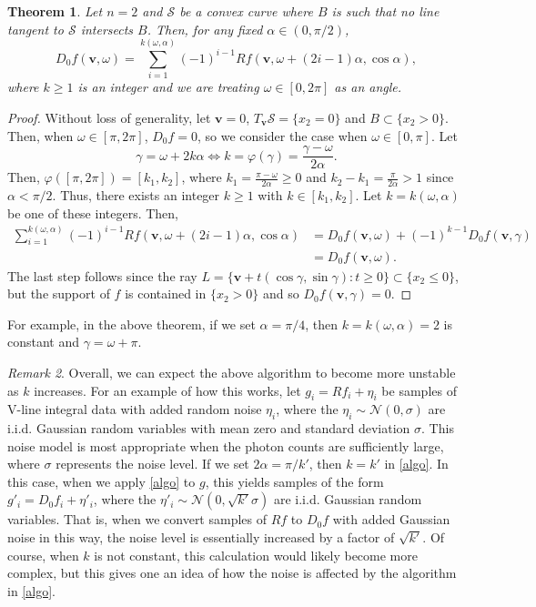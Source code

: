 \documentclass[a4paper,12pt]{amsart}
\numberwithin{equation}{section}
\theoremstyle{plain}
\newtheorem{theorem}{Theorem}
\numberwithin{theorem}{section}
\theoremstyle{definition}
\theoremstyle{remark}
\newtheorem{remark}[theorem]{Remark}
\theoremstyle{remark}
\theoremstyle{remark}
\newcommand{\s}{\mathcal S}
\newcommand{\vv}{{\mathbf{v}}}
\begin{document}
\begin{theorem}\label{simple_algo}
Let $n=2$ and $\s$ be a convex curve where $B$ is such that no line tangent to $\s$ intersects $B$. Then, for any fixed $\alpha \in (0,\pi/2)$,
\begin{equation}
D_{0}f(\vv,\omega) = \sum_{i=1}^{k(\omega, \alpha)} (-1)^{i-1} Rf(\vv,\omega + (2i-1)\alpha, \cos\alpha),
\end{equation}
where $k \geq 1$ is an integer and we are treating $\omega \in [0,2\pi]$ as an angle.
\end{theorem}
\begin{proof}
Without loss of generality, let $\vv = 0$, $T_\vv\s = \{x_2 = 0\}$ and $B \subset \{x_2 > 0\}$. Then, when $\omega \in [\pi,2\pi]$, $D_{0}f = 0$, so we consider the case when $\omega \in [0,\pi]$. Let
$$\gamma = \omega +2k \alpha \iff k = \varphi(\gamma) = \frac{\gamma - \omega}{2\alpha}.$$
Then, $\varphi([\pi,2\pi]) = [k_1,k_2]$, where $k_1 = \frac{\pi - \omega}{2\alpha}\geq 0$ and $k_2 - k_1 = \frac{\pi}{2\alpha} > 1$ since $\alpha < \pi/2$. Thus, there exists an integer $k\geq 1$ with $k \in [k_1, k_2]$. Let $k = k(\omega, \alpha)$ be one of these integers. Then,
\begin{equation}\label{algo}
\begin{split}
\sum_{i=1}^{k(\omega, \alpha)} (-1)^{i-1} Rf(\vv,\omega + (2i-1)\alpha, \cos\alpha) &= D_{0}f(\vv,\omega) + (-1)^{k-1}D_{0}f(\vv,\gamma)\\
 &= D_{0}f(\vv,\omega).
\end{split}
\end{equation}
The last step follows since the ray $L = \{\vv + t(\cos\gamma,\sin\gamma) : t\geq 0\} \subset \{x_2 \leq 0\}$, but the support of $f$ is contained in $\{x_2 > 0\}$ and so $D_{0}f(\vv,\gamma) = 0$.
\end{proof}
For example, in the above theorem, if we set $\alpha = \pi/4$, then $k = k(\omega,\alpha) = 2$ is constant and $\gamma = \omega + \pi$.

\begin{remark}\label{remark_noise}
    Overall, we can expect the above algorithm to become more unstable as $k$ increases. For an example of how this works, let $g_i = Rf_i + \eta_i$ be samples of V-line integral data with added random noise $\eta_i$, where the $\eta_i \sim \mathcal{N}(0,\sigma)$ are i.i.d. Gaussian random variables with mean zero and standard deviation $\sigma$. This noise model is most appropriate when the photon counts are sufficiently large, where $\sigma$ represents the noise level. If we set $2\alpha = \pi/k'$, then $k = k'$ in \eqref{algo}. In this case, when we apply \eqref{algo} to $g$, this yields samples of the form $g'_i = D_{0}f_i + \eta'_i$, where the $\eta'_i \sim \mathcal{N}(0,\sqrt{k'}\sigma)$ are i.i.d. Gaussian random variables. That is, when we convert samples of $Rf$ to $D_{0}f$ with added Gaussian noise in this way, the noise level is essentially increased by a factor of $\sqrt{k'}$. Of course, when $k$ is not constant, this calculation would likely become more complex, but this gives one an idea of how the noise is affected by the algorithm in \eqref{algo}.
\end{remark}
\end{document}
